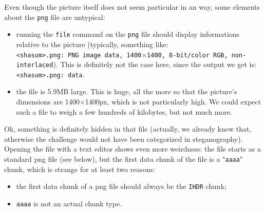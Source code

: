 \documentclass[12pt,a4paper]{article}
\begin{document}
    \begin{figure}[H]
        \begin{center}
        \end{center}
    \end{figure}

    Even though the picture itself does not seem particular in an way, some elements about the \texttt{png} file are untypical:
    \begin{itemize}
        \item[\bullet] running the \texttt{file} command on the \texttt{png} file should display informations relative to the picture (typically, something like:\\
            \texttt{<shasum>.png: PNG image data, 1400$\times$1400, 8-bit/color RGB, non-interlaced}).
            This is definitely not the case here, since the output we get is:\\
            \texttt{<shasum>.png: data}.
        \item[\bullet] the file is 5.9MB large. This is huge, all the more so
            that the picture's dimensions are 1400$\times$1400px, which is not
            particularly high. We could expect such a file to weigh a few
            hundreds of kilobytes, but not much more.
    \end{itemize}

    \vspace{1em}
    Ok, something is definitely hidden in that file (actually, we already knew that, otherwise the challenge would not have been categorized in steganography).\\

    Opening the file with a text editor shows even more weirdness: the file starts as a standard png file (see below), but the first data chunk of the file is a "\texttt{aaaa}" chunk, which is strange for at least two reasons:
    \begin{itemize}
        \item[\bullet] the first data chunk of a png file should always be the \texttt{IHDR} chunk;
        \item[\bullet] \texttt{aaaa} is not an actual chunk type.
    \end{itemize}
\end{document}
